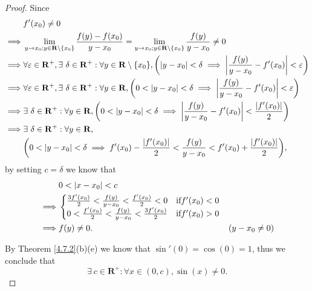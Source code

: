 \begin{proof}
    Since
    \begin{align*}
                 & f'(x_0) \neq 0                                                                                                                                                                                                        \\
        \implies & \lim_{y \to x_0 ; y \in \mathbf{R} \setminus \{x_0\}} \frac{f(y) - f(x_0)}{y - x_0} = \lim_{y \to x_0 ; y \in \mathbf{R} \setminus \{x_0\}} \frac{f(y)}{y - x_0} \neq 0                                               \\
        \implies & \forall \varepsilon \in \mathbf{R}^+, \exists\ \delta \in \mathbf{R}^+ : \forall y \in \mathbf{R} \setminus \{x_0\}, \bigg(\abs*{y - x_0} < \delta \implies \abs*{\frac{f(y)}{y - x_0} - f'(x_0)} < \varepsilon\bigg) \\
        \implies & \forall \varepsilon \in \mathbf{R}^+, \exists\ \delta \in \mathbf{R}^+ : \forall y \in \mathbf{R}, \bigg(0 < \abs*{y - x_0} < \delta \implies \abs*{\frac{f(y)}{y - x_0} - f'(x_0)} < \varepsilon\bigg)               \\
        \implies & \exists\ \delta \in \mathbf{R}^+ : \forall y \in \mathbf{R}, \bigg(0 < \abs*{y - x_0} < \delta \implies \abs*{\frac{f(y)}{y - x_0} - f'(x_0)} < \frac{\abs*{f'(x_0)}}{2}\bigg)                                        \\
        \implies & \exists\ \delta \in \mathbf{R}^+ : \forall y \in \mathbf{R},                                                                                                                                                          \\
                 & \bigg(0 < \abs*{y - x_0} < \delta \implies f'(x_0) - \frac{\abs*{f'(x_0)}}{2} < \frac{f(y)}{y - x_0} < f'(x_0) + \frac{\abs*{f'(x_0)}}{2}\bigg),
    \end{align*}
    by setting \(c = \delta\) we know that
    \begin{align*}
                 & 0 < \abs*{x - x_0} < c                                                                                           \\
        \implies & \begin{cases}
                       \frac{3 f'(x_0)}{2} < \frac{f(y)}{y - x_0} < \frac{f'(x_0)}{2} < 0 & \text{if} f'(x_0) < 0 \\
                       0 < \frac{f'(x_0)}{2} < \frac{f(y)}{y - x_0} < \frac{3 f'(x_0)}{2} & \text{if} f'(x_0) > 0
                   \end{cases}                       \\
        \implies & f(y) \neq 0.                                                                                  & (y - x_0 \neq 0)
    \end{align*}

    By Theorem \ref{4.7.2}(b)(e) we know that \(\sin'(0) = \cos(0) = 1\), thus we conclude that
    \[
        \exists\ c \in \mathbf{R}^+ : \forall x \in (0, c), \sin(x) \neq 0.
    \]
\end{proof}

